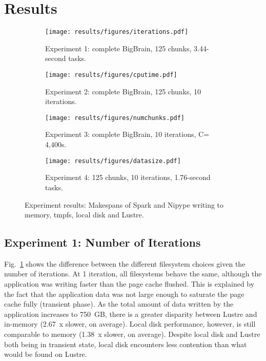 \documentclass{IEEEtran}
\begin{document}
\section{Results} %
\label{sec:results}


\begin{figure*}
\begin{subfigure}{\columnwidth}
    \centering
    \texttt{[image: results/figures/iterations.pdf]}
    \caption{Experiment 1: complete BigBrain, 125 chunks, 3.44-second tasks.}\label{fig:iterations}
\end{subfigure}
\begin{subfigure}{\columnwidth}
    \centering
    \texttt{[image: results/figures/cputime.pdf]}
    \caption{Experiment 2: complete BigBrain, 125 chunks, 10 iterations.}\label{fig:cputime}
\end{subfigure}
\begin{subfigure}{\columnwidth}
    \centering
    \texttt{[image: results/figures/numchunks.pdf]}
    \caption{Experiment 3: complete BigBrain, 10 iterations, C= 4,400s.}\label{fig:numchunks}
\end{subfigure}
\begin{subfigure}{\columnwidth}
    \centering
    \texttt{[image: results/figures/datasize.pdf]}
    \caption{Experiment 4: 125 chunks, 10 iterations, 1.76-second tasks.}\label{fig:datasize}
\end{subfigure}
\caption{Experiment results: Makespans of Spark and Nipype writing to memory, tmpfs, local  disk and Lustre.}
\label{fig:results}
\end{figure*}
\subsection{Experiment 1: Number of Iterations}

Fig.~\ref{fig:iterations} shows the difference between the different 
filesystem choices given the number of iterations. At 1 iteration, all 
filesystems behave the same, although the application was writing faster than the page cache flushed.
This is explained by the fact that the application data was not large enough to saturate the page  
cache fully (transient phase). As the total amount of data written by the 
application increases to 750~GB, there is a greater disparity between 
Lustre and in-memory (2.67~x slower, on average). Local disk 
performance, however, 
is still comparable to memory (1.38~x slower, on average). Despite local disk and 
Lustre both being in transient state, local disk encounters less contention 
than what would be found on Lustre. 
\end{document}

